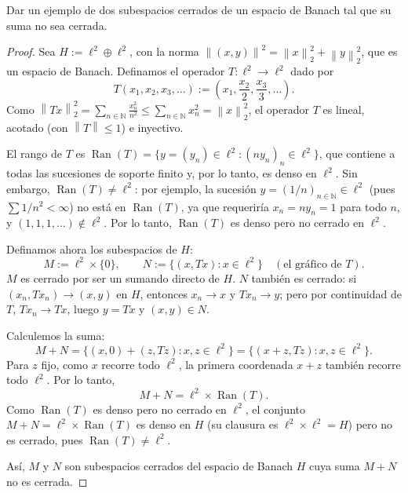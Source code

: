 \documentclass{article}
\theoremstyle{definition}
\newcommand{\N}{\mathbb{N}}
\newcommand{\norm}[1]{\left\lVert #1 \right\rVert}       %
\newenvironment{ejercicio}[1]{\begin{trivlist}
\item[\hskip \labelsep {\bfseries Ejercicio}\hskip \labelsep {\bfseries #1.}]}{\end{trivlist}}
\begin{document}
\begin{ejercicio}{15}
    Dar un ejemplo de dos subespacios cerrados de un espacio de Banach tal que su suma no sea cerrada.
\end{ejercicio}
\begin{proof}
    Sea \( H := \ell^2 \oplus \ell^2 \), con la norma \( \norm{(x,y)}^2 = \norm{x}_2^2 + \norm{y}_2^2 \), que es un espacio de Banach. Definamos el operador \( T:\ell^2\to\ell^2 \) dado por
    \[
        T(x_1,x_2,x_3,\dots) := \left(x_1, \frac{x_2}{2}, \frac{x_3}{3}, \dots\right).
    \]
    Como \( \norm{Tx}_2^2 = \sum_{n\in\N} \frac{x_n^2}{n^2} \leq \sum_{n\in\N} x_n^2 = \norm{x}_2^2 \), el operador \(T\) es lineal, acotado (con \( \norm{T}\leq 1 \)) e inyectivo.

    El rango de \(T\) es \( \operatorname{Ran}(T) = \{ y=(y_n) \in \ell^2 : (n y_n)_{n} \in \ell^2 \} \), que contiene a todas las sucesiones de soporte finito y, por lo tanto, es denso en \( \ell^2 \). Sin embargo, \( \operatorname{Ran}(T) \neq \ell^2 \): por ejemplo, la sucesión \( y = (1/n)_{n\in\N} \in \ell^2 \) (pues \( \sum 1/n^2 <\infty \)) no está en \( \operatorname{Ran}(T) \), ya que requeriría \( x_n = n y_n = 1 \) para todo \(n\), y \( (1,1,1,\dots) \notin \ell^2 \). Por lo tanto, \( \operatorname{Ran}(T) \) es denso pero no cerrado en \( \ell^2 \).

    Definamos ahora los subespacios de \(H\):
    \[
        M := \ell^2 \times \{0\}, \qquad N := \{ (x, Tx) : x \in \ell^2 \} \quad (\text{el gráfico de } T).
    \]
    \(M\) es cerrado por ser un sumando directo de \(H\). \(N\) también es cerrado: si \( (x_n, Tx_n) \to (x,y) \) en \(H\), entonces \( x_n \to x \) y \( Tx_n \to y \); pero por continuidad de \(T\), \( Tx_n \to Tx \), luego \( y = Tx \) y \( (x,y) \in N \).

    Calculemos la suma:
    \[
        M + N = \{ (x,0) + (z,Tz) : x,z \in \ell^2 \} = \{ (x+z, Tz) : x,z \in \ell^2 \}.
    \]
    Para \(z\) fijo, como \(x\) recorre todo \( \ell^2 \), la primera coordenada \( x+z \) también recorre todo \( \ell^2 \). Por lo tanto,
    \[
        M+N = \ell^2 \times \operatorname{Ran}(T).
    \]
    Como \( \operatorname{Ran}(T) \) es denso pero no cerrado en \( \ell^2 \), el conjunto \( M+N = \ell^2 \times \operatorname{Ran}(T) \) es denso en \(H\) (su clausura es \( \ell^2 \times \ell^2 = H \)) pero no es cerrado, pues \( \operatorname{Ran}(T) \neq \ell^2 \).

    Así, \(M\) y \(N\) son subespacios cerrados del espacio de Banach \(H\) cuya suma \(M+N\) no es cerrada.
\end{proof}
\end{document}
